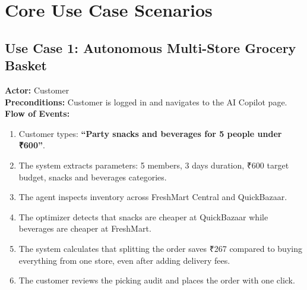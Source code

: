 \section{Core Use Case Scenarios}

\subsection{Use Case 1: Autonomous Multi-Store Grocery Basket}
\textbf{Actor:} Customer\\
\textbf{Preconditions:} Customer is logged in and navigates to the AI Copilot page.\\
\textbf{Flow of Events:}
\begin{enumerate}
    \item Customer types: \textbf{``Party snacks and beverages for 5 people under ₹600''}.
    \item The system extracts parameters: 5 members, 3 days duration, ₹600 target budget, snacks and beverages categories.
    \item The agent inspects inventory across FreshMart Central and QuickBazaar.
    \item The optimizer detects that snacks are cheaper at QuickBazaar while beverages are cheaper at FreshMart.
    \item The system calculates that splitting the order saves ₹267 compared to buying everything from one store, even after adding delivery fees.
    \item The customer reviews the picking audit and places the order with one click.
\end{enumerate}

